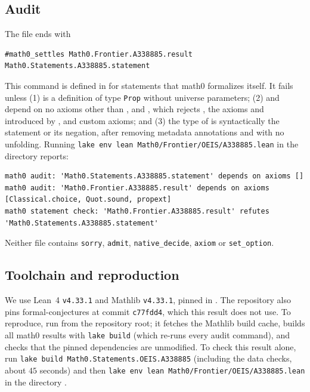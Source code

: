 \documentclass[11pt]{amsart}
\theoremstyle{plain}
\theoremstyle{definition}
\begin{document}
\subsection*{Audit}
The file ends with
\begin{lstlisting}
#math0_settles Math0.Frontier.A338885.result Math0.Statements.A338885.statement
\end{lstlisting}
This command is defined in  for statements that math0 formalizes itself. It fails unless (1)  is a definition of type \texttt{Prop} without universe parameters; (2)  and  depend on no axioms other than ,  and , which rejects , the axioms  and  introduced by , and custom axioms; and (3) the type of  is syntactically the statement or its negation, after removing metadata annotations and with no unfolding. Running \texttt{lake env lean Math0/Frontier/OEIS/A338885.lean} in the directory  reports:
\begin{lstlisting}[basicstyle=\ttfamily\scriptsize]
math0 audit: 'Math0.Statements.A338885.statement' depends on axioms []
math0 audit: 'Math0.Frontier.A338885.result' depends on axioms [Classical.choice, Quot.sound, propext]
math0 statement check: 'Math0.Frontier.A338885.result' refutes 'Math0.Statements.A338885.statement'
\end{lstlisting}
Neither file contains \texttt{sorry}, \texttt{admit}, \texttt{native\_decide}, \texttt{axiom} or \texttt{set\_option}.

\subsection*{Toolchain and reproduction}
We use Lean~4 \cite{Lean4} \texttt{v4.33.1} and Mathlib \cite{Mathlib} \texttt{v4.33.1}, pinned in . The repository also pins formal-conjectures \cite{FC} at commit \texttt{c77fdd4}, which this result does not use. To reproduce, run  from the repository root; it fetches the Mathlib build cache, builds all math0 results with \texttt{lake build} (which re-runs every audit command), and checks that the pinned dependencies are unmodified. To check this result alone, run \texttt{lake build Math0.Statements.OEIS.A338885} (including the data checks, about $45$ seconds) and then \texttt{lake env lean Math0/Frontier/OEIS/A338885.lean} in the directory .
\end{document}
